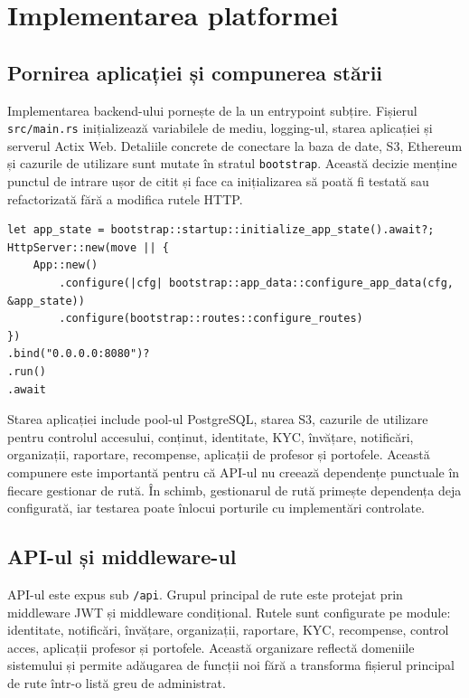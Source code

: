 \chapter{Implementarea platformei}

\section{Pornirea aplicației și compunerea stării}
Implementarea backend-ului pornește de la un entrypoint subțire. Fișierul \texttt{src/main.rs} inițializează variabilele de mediu, logging-ul, starea aplicației și serverul Actix Web. Detaliile concrete de conectare la baza de date, S3, Ethereum și cazurile de utilizare sunt mutate în stratul \texttt{bootstrap}. Această decizie menține punctul de intrare ușor de citit și face ca inițializarea să poată fi testată sau refactorizată fără a modifica rutele HTTP.

\begin{lstlisting}[style=cod,caption={Structura simplificată a pornirii serverului RustLearn.},label={lst:pornire}]
let app_state = bootstrap::startup::initialize_app_state().await?;
HttpServer::new(move || {
    App::new()
        .configure(|cfg| bootstrap::app_data::configure_app_data(cfg, &app_state))
        .configure(bootstrap::routes::configure_routes)
})
.bind("0.0.0.0:8080")?
.run()
.await
\end{lstlisting}

Starea aplicației include pool-ul PostgreSQL, starea S3, cazurile de utilizare pentru controlul accesului, conținut, identitate, KYC, învățare, notificări, organizații, raportare, recompense, aplicații de profesor și portofele. Această compunere este importantă pentru că API-ul nu creează dependențe punctuale în fiecare gestionar de rută. În schimb, gestionarul de rută primește dependența deja configurată, iar testarea poate înlocui porturile cu implementări controlate.

\section{API-ul și middleware-ul}
API-ul este expus sub \texttt{/api}. Grupul principal de rute este protejat prin middleware JWT și middleware condițional. Rutele sunt configurate pe module: identitate, notificări, învățare, organizații, raportare, KYC, recompense, control acces, aplicații profesor și portofele. Această organizare reflectă domeniile sistemului și permite adăugarea de funcții noi fără a transforma fișierul principal de rute într-o listă greu de administrat.

